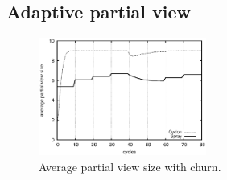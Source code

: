 
\subsection{Adaptive partial view}

\begin{figure}
  \centering
  \includegraphics[width=0.49\textwidth]{img/avgpv.eps}
  \caption{\label{fig:churn}Average partial view size with churn.}
\end{figure}


